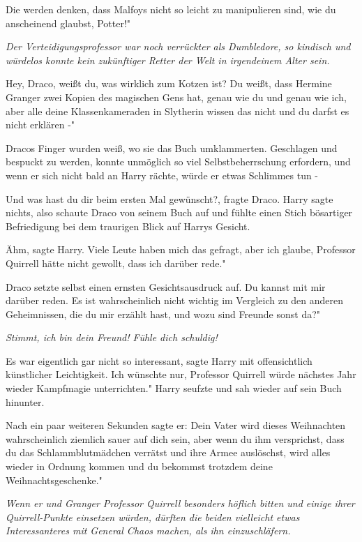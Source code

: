 \glqq Die werden denken, dass Malfoys nicht so leicht zu manipulieren sind, wie
du anscheinend glaubst, Potter!"

\emph{Der Verteidigungsprofessor war noch verrückter als Dumbledore, so
kindisch und würdelos konnte kein zukünftiger Retter der Welt in irgendeinem
Alter sein.}

\glqq Hey, Draco, weißt du, was wirklich zum Kotzen ist? Du weißt, dass Hermine
Granger zwei Kopien des magischen Gens hat, genau wie du und genau wie ich, aber
alle deine Klassenkameraden in Slytherin wissen das nicht und du darfst es nicht
erklären -"

Dracos Finger wurden weiß, wo sie das Buch umklammerten. Geschlagen und bespuckt
zu werden, konnte unmöglich so viel Selbstbeherrschung erfordern, und wenn er
sich nicht bald an Harry rächte, würde er etwas Schlimmes tun -

\glqq Und was hast du dir beim ersten Mal gewünscht?\grqq{}, fragte Draco. Harry
sagte nichts, also schaute Draco von seinem Buch auf und fühlte einen Stich
bösartiger Befriedigung bei dem traurigen Blick auf Harrys Gesicht.

\glqq Ähm\grqq{}, sagte Harry. \glqq Viele Leute haben mich das gefragt, aber
ich glaube, Professor Quirrell hätte nicht gewollt, dass ich darüber rede."

Draco setzte selbst einen ernsten Gesichtsausdruck auf. \glqq Du kannst mit mir
darüber reden. Es ist wahrscheinlich nicht wichtig im Vergleich zu den anderen
Geheimnissen, die du mir erzählt hast, und wozu sind Freunde sonst da?"

\emph{Stimmt, ich bin dein Freund! Fühle dich schuldig!}

\glqq Es war eigentlich gar nicht so interessant\grqq{}, sagte Harry mit
offensichtlich künstlicher Leichtigkeit. \glqq Ich wünschte nur, Professor
Quirrell würde nächstes Jahr wieder Kampfmagie unterrichten." Harry seufzte und
sah wieder auf sein Buch hinunter.

Nach ein paar weiteren Sekunden sagte er: \glqq Dein Vater wird dieses
Weihnachten wahrscheinlich ziemlich sauer auf dich sein, aber wenn du ihm
versprichst, dass du das Schlammblutmädchen verrätst und ihre Armee auslöschst,
wird alles wieder in Ordnung kommen und du bekommst trotzdem deine
Weihnachtsgeschenke."

\emph{Wenn er und Granger Professor Quirrell besonders höflich bitten und
einige ihrer Quirrell-Punkte einsetzen würden, dürften die beiden vielleicht
etwas Interessanteres mit General Chaos machen, als ihn einzuschläfern.}

